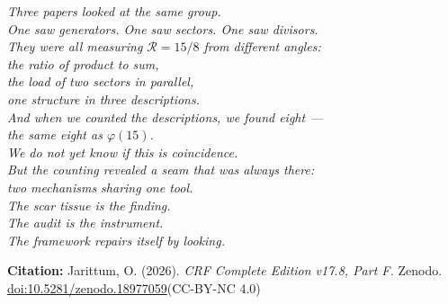 \documentclass[12pt, a4paper]{article}
\begin{document}
\begin{center}
\textit{%
Three papers looked at the same group.\\
One saw generators. One saw sectors. One saw divisors.\\[0.4em]
They were all measuring $\mathcal{R} = 15/8$ from different angles:\\
the ratio of product to sum,\\
the load of two sectors in parallel,\\
one structure in three descriptions.\\[0.4em]
And when we counted the descriptions, we found eight ---\\
the same eight as $\varphi(15)$.\\[0.4em]
We do not yet know if this is coincidence.\\
But the counting revealed a seam that was always there:\\
two mechanisms sharing one tool.\\[0.4em]
The scar tissue is the finding.\\
The audit is the instrument.\\
The framework repairs itself by looking.}
\end{center}

\bigskip
\begin{center}
\textbf{Citation:} Jarittum, O. (2026).
\textit{CRF Complete Edition v17.8, Part F.}
Zenodo.
\href{https://doi.org/10.5281/zenodo.18977059}%
{doi:10.5281/zenodo.18977059}\quad (CC-BY-NC 4.0)
\end{center}

\end{document}
